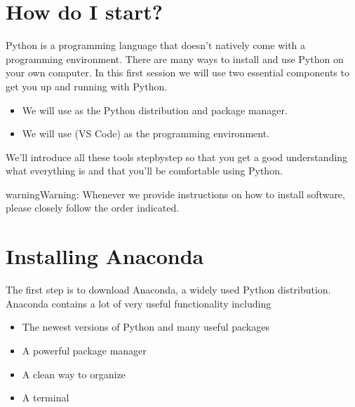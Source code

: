 \documentclass[letterpaper,10pt,english]{jupyterBook}
\begin{document}
\section{How do I start?}
\label{\detokenize{notebooks/01_GettingStarted/01_GettingStarted_student:how-do-i-start}}
\sphinxAtStartPar
Python is a programming language that doesn’t natively come with a programming environment. There are many ways to install and use Python on your own computer. In this first session we will use two essential components to get you up and running with Python.
\begin{itemize}
\item {} 
\sphinxAtStartPar
We will use  as the Python distribution and package manager.

\item {} 
\sphinxAtStartPar
We will use  (VS Code) as the programming environment.

\end{itemize}

\sphinxAtStartPar
We’ll introduce all these tools step\sphinxhyphen{}by\sphinxhyphen{}step so that you get a good understanding what everything is and that you’ll be comfortable using Python.

\begin{sphinxadmonition}{warning}{Warning:}
\sphinxAtStartPar
Whenever we provide instructions on how to install software, please closely follow the order indicated.
\end{sphinxadmonition}


\section{Installing Anaconda}
\label{\detokenize{notebooks/01_GettingStarted/01_GettingStarted_student:installing-anaconda}}
\sphinxAtStartPar
The first step is to download Anaconda, a widely used Python distribution. Anaconda contains a lot of very useful functionality including
\begin{itemize}
\item {} 
\sphinxAtStartPar
The newest versions of Python and many useful packages

\item {} 
\sphinxAtStartPar
A powerful package manager

\item {} 
\sphinxAtStartPar
A clean way to organize 

\item {} 
\sphinxAtStartPar
A terminal

\end{itemize}
\end{document}
